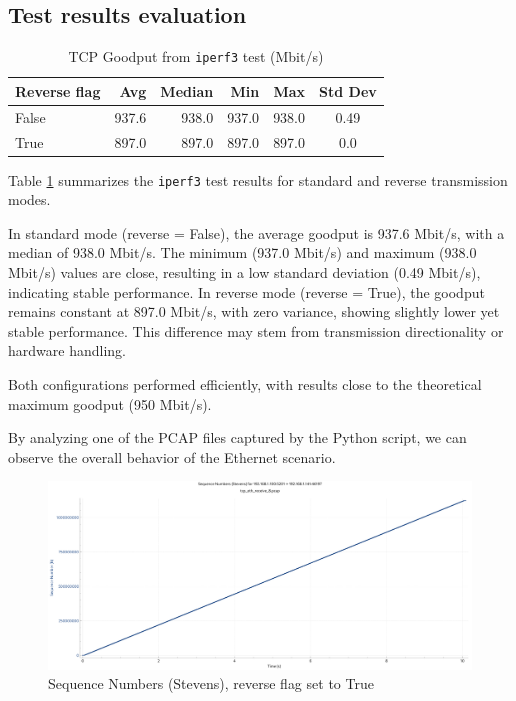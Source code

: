 \subsection{Test results evaluation}
\begin{table}[htbp]
    \centering
    \caption{TCP Goodput from \texttt{iperf3} test (Mbit/s)}
    \label{tab:tcp-throughput-wired}
    \begin{tabular}{lrrrrc}
        \hline
        \textbf{Reverse flag} & \textbf{Avg} & \textbf{Median} & \textbf{Min} & \textbf{Max} & \textbf{Std Dev} \\
        \hline
        False & 937.6 & 938.0 & 937.0 & 938.0 & 0.49 \\
        True & 897.0 & 897.0 & 897.0 & 897.0 & 0.0 \\
        \hline
    \end{tabular}
    \end{table}

Table \ref{tab:tcp-throughput-wired} summarizes the \texttt{iperf3} test results for standard and reverse transmission modes.

In standard mode (reverse = False), the average goodput is 937.6 Mbit/s, with a median of 938.0 Mbit/s. The minimum (937.0 Mbit/s) and maximum (938.0 Mbit/s) values are close, resulting in a low standard deviation (0.49 Mbit/s), indicating stable performance. In reverse mode (reverse = True), the goodput remains constant at 897.0 Mbit/s, with zero variance, showing slightly lower yet stable performance. This difference may stem from transmission directionality or hardware handling.

Both configurations performed efficiently, with results close to the theoretical maximum goodput (950 Mbit/s).

By analyzing one of the PCAP files captured by the Python script, we can observe the overall behavior of the Ethernet scenario.

\begin{figure}[H]
    \centering
    \includegraphics[width=0.75\linewidth]{SeqNumberEth.pdf}
    \caption{Sequence Numbers (Stevens), reverse flag set to True}
    \label{fig:enter-label}
\end{figure}


